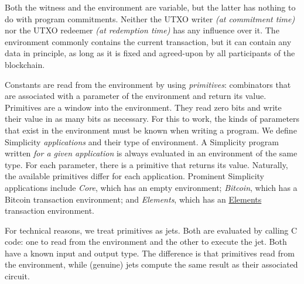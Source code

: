 Both the witness and the environment are variable,
but the latter has nothing to do with program commitments.
Neither the UTXO writer \emph{(at commitment time)}
nor the UTXO redeemer \emph{(at redemption time)} has any influence over it.
%
The environment commonly contains the current transaction,
but it can contain any data in principle,
as long as it is fixed and agreed-upon by all participants of the blockchain.

Constants are read from the environment by using \emph{primitives}:
combinators that are associated with a parameter of the environment and return its value.
Primitives are a window into the environment.
They read zero bits and write their value in as many bits as necessary.
For this to work,
the kinds of parameters that exist in the environment must be known when writing a program.
We define Simplicity \emph{applications} and their type of environment.
A Simplicity program written \emph{for a given application} is always evaluated in an environment of the same type.
For each parameter,
there is a primitive that returns its value.
Naturally,
the available primitives differ for each application.
Prominent Simplicity applications include \emph{Core}, which has an empty environment;
\emph{Bitcoin}, which has a Bitcoin transaction environment; and
\emph{Elements}, which has an \href{https://elementsproject.org/}{Elements} transaction environment.

For technical reasons,
we treat primitives as jets.
Both are evaluated by calling C code:
one to read from the environment and the other to execute the jet.
Both have a known input and output type.
The difference is that primitives read from the environment,
while (genuine) jets compute the same result as their associated circuit.


